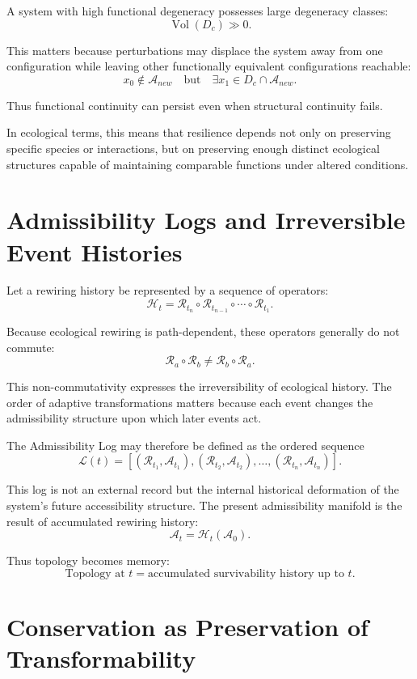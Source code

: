 \documentclass[11pt,a4paper]{article}
\newcommand{\Aspace}{\mathcal{A}}
\begin{document}
A system with high functional degeneracy possesses large degeneracy classes:
\[
\operatorname{Vol}(D_c)\gg 0.
\]

This matters because perturbations may displace the system away from one configuration while leaving other functionally equivalent configurations reachable:
\[
x_0 \notin \Aspace_{new}
\quad \text{but} \quad
\exists x_1\in D_c\cap \Aspace_{new}.
\]

Thus functional continuity can persist even when structural continuity fails.

In ecological terms, this means that resilience depends not only on preserving specific species or interactions, but on preserving enough distinct ecological structures capable of maintaining comparable functions under altered conditions.

\section{Admissibility Logs and Irreversible Event Histories}

Let a rewiring history be represented by a sequence of operators:
\[
\mathcal{H}_t=
\mathcal{R}_{t_n}\circ \mathcal{R}_{t_{n-1}}\circ \cdots \circ \mathcal{R}_{t_1}.
\]

Because ecological rewiring is path-dependent, these operators generally do not commute:
\[
\mathcal{R}_a\circ \mathcal{R}_b
\neq
\mathcal{R}_b\circ \mathcal{R}_a.
\]

This non-commutativity expresses the irreversibility of ecological history. The order of adaptive transformations matters because each event changes the admissibility structure upon which later events act.

The Admissibility Log may therefore be defined as the ordered sequence
\[
\mathcal{L}(t)=
\left[
(\mathcal{R}_{t_1},\Aspace_{t_1}),
(\mathcal{R}_{t_2},\Aspace_{t_2}),
\ldots,
(\mathcal{R}_{t_n},\Aspace_{t_n})
\right].
\]

This log is not an external record but the internal historical deformation of the system's future accessibility structure. The present admissibility manifold is the result of accumulated rewiring history:
\[
\Aspace_t
=
\mathcal{H}_t(\Aspace_0).
\]

Thus topology becomes memory:
\[
\text{Topology at } t
=
\text{accumulated survivability history up to } t.
\]

\section{Conservation as Preservation of Transformability}
\end{document}
